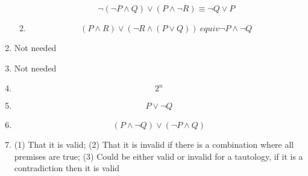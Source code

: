 \begin{enumerate}
\begin{enumerate}
        \[\lnot (\lnot P \land Q) \lor (P \land \lnot R) \equiv \lnot Q \lor P\]
        \item 
        \[(P \land R) \lor (\lnot R \land (P \lor Q)) \ equiv \lnot P \land \lnot Q\]
    \end{enumerate}
    \item 
    Not needed
    \item 
    Not needed
    \item 
    \[2 ^ n\]
    \item 
    \[P \lor \lnot Q\]
    \item
    \[(P \land \lnot Q) \lor (\lnot P \land Q)\]
    \item
    (1) That it is valid; (2) That it is invalid if there is a combination where all premises are true; (3) Could be either valid or invalid for a tautology, if it is a contradiction then it is valid
    
    
\end{enumerate}

